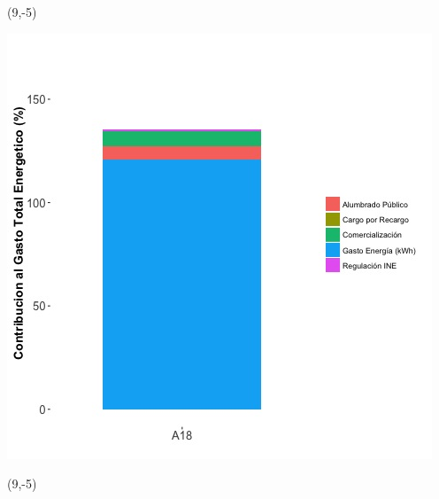 \documentclass{article}\usepackage[]{graphicx}\usepackage[]{color}
\newenvironment{knitrout}{}{} %
\begin{document}
 \begin{textblock}{1}(9,-5)
\begin{minipage}{20em}
\begingroup

\endgroup
\end{minipage}
\end{textblock}

\begin{knitrout}
\color{fgcolor}
\includegraphics[scale=0.65]{figure/A18_costvars_plot.jpg} 
\end{knitrout}

 \begin{textblock}{1}(9,-5)
\begin{minipage}{20em}
\begingroup

\endgroup
\end{minipage}
\end{textblock}
\end{document}
